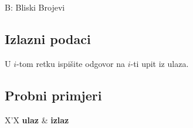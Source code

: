 \begin{statement}[
  timelimit=1 s,
  memorylimit=512 MiB,
]{B: Bliski Brojevi}
\subsection*{Izlazni podaci}
U $i$-tom retku ispišite odgovor na $i$-ti upit iz ulaza.

\subsection*{Probni primjeri}
\begin{tabularx}{\textwidth}{X'X}
  \textbf{ulaz}
  \linespread{1}{} &
  \textbf{izlaz}
  \linespread{1}{}
\end{tabularx}

\end{statement}

